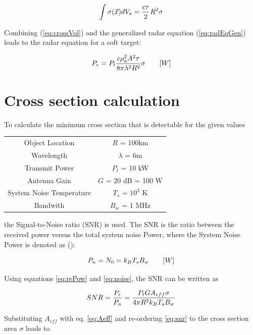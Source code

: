 \begin{equation}
	\label{eq:crossVol}
	\centering
	\int \sigma(\vec{x}) dV_s = \frac{ c \tau}{2} R^2 \sigma
\end{equation}

Combining (\ref{eq:crossVol}) and the generalized radar equation (\ref{eq:radEqGen}) leads to the radar equation for a soft target:

\begin{equation}
\label{eq:radEqSoft}
	\centering
	P_{r} = P_t \frac{c \rho_a^2 A^2 \tau}{8 \pi \lambda^2 R^2} \sigma \qquad [W]
\end{equation}


\section{Cross section calculation}
To calculate the minimum cross section that is detectable for the given values

\begin{center}
\begin{tabular}{c c}
	Object Location & $R$ = 100km \\
	Wavelength & $\lambda$ = 6m \\
	Transmit Power & $P_t$ = 10 kW \\
	Antenna Gain & $G$ = 20 dB = 100 W\\
	System Noise Temperature & $T_s$ = $10^3$ K \\
	Bandwith & $B_w$ = 1 MHz
\end{tabular}
\end{center}

the Signal-to-Noise ratio (SNR) is used. The SNR is the ratio between the received power versus the total system noise Power, where the System Noise Power is  denoted as (\citep{richards2010principles}):

\begin{equation}
\label{eq:noise}
	\centering
	P_n = N_0 = k_B T_s B_w \qquad [W]
\end{equation}

Using equations \ref{eq:rePow} and \ref{eq:noise}, the SNR can be written as

\begin{equation}
\label{eq:snr}
	\centering
	SNR = \frac{P_r}{P_n} = \frac{P_t G A_{eff} \sigma}{4 \pi R^2 k_B T_s B_w}
\end{equation}

Substituting $A_{eff}$ with eq. \ref{eq:Aeff} and re-ordering \ref{eq:snr} to the cross section area $\sigma$ leads to

